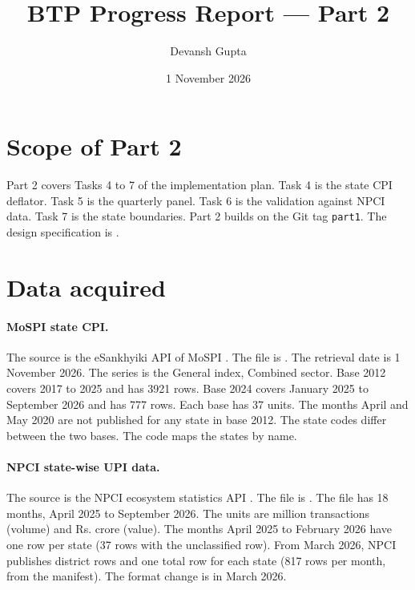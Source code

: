 \documentclass[11pt,a4paper]{article}
\title{BTP Progress Report --- Part 2}
\author{Devansh Gupta}
\date{1 November 2026}
\begin{document}
\maketitle

\section{Scope of Part 2}
Part 2 covers Tasks 4 to 7 of the implementation plan. Task 4 is the state CPI deflator. Task 5 is the quarterly panel. Task 6 is the validation against NPCI data. Task 7 is the state boundaries.
Part 2 builds on the Git tag \texttt{part1}.
The design specification is .

\section{Data acquired}
\paragraph{MoSPI state CPI.}
The source is the eSankhyiki API of MoSPI \citep{mospi_cpi}. The file is . The retrieval date is 1 November 2026. The series is the General index, Combined sector.
Base 2012 covers 2017 to 2025 and has 3921 rows. Base 2024 covers January 2025 to September 2026 and has 777 rows. Each base has 37 units.
The months April and May 2020 are not published for any state in base 2012. The state codes differ between the two bases. The code maps the states by name.

\paragraph{NPCI state-wise UPI data.}
The source is the NPCI ecosystem statistics API \citep{npci_upi_state}. The file is .
The file has 18 months, April 2025 to September 2026. The units are million transactions (volume) and Rs. crore (value).
The months April 2025 to February 2026 have one row per state (37 rows with the unclassified row). From March 2026, NPCI publishes district rows and one total row for each state (817 rows per month, from the manifest). The format change is in March 2026.
\end{document}
